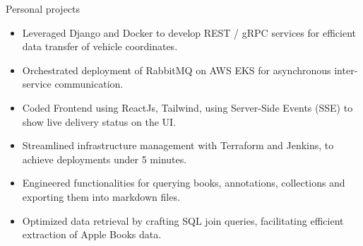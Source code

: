 \documentclass{resume}
\begin{document}
\begin{experienceSection}{Personal projects}
    \projectItem[
        title={Delivery Tracking System},
        keyHighlight=implemented a highly scalable microservice architecture consisting of 5 services.
    ]
    \begin{itemize}
        \vspace{-0.5em}
        \itemsep -6pt {}
        \item Leveraged Django and Docker to develop REST / gRPC services for efficient data transfer of vehicle coordinates.
        \item Orchestrated deployment of RabbitMQ on AWS EKS for asynchronous inter-service communication.
        \item Coded Frontend using ReactJs, Tailwind, using Server-Side Events (SSE) to show live delivery status on the UI.
        \item Streamlined infrastructure management with Terraform and Jenkins, to achieve deployments under 5 minutes.
    \end{itemize}

    \projectItem[
        title=Py-Apple-Books,
        keyHighlight=Published a python package in PyPi enabling users to interact with Apple Books data programmatically.
    ]
    \begin{itemize}
        \vspace{-0.5em}
        \itemsep -6pt {}
        \item Engineered functionalities for querying books, annotations, collections and exporting them into markdown files.
        \item Optimized data retrieval by crafting SQL join queries, facilitating efficient extraction of Apple Books data.
    \end{itemize}
\end{experienceSection}

\end{document}
